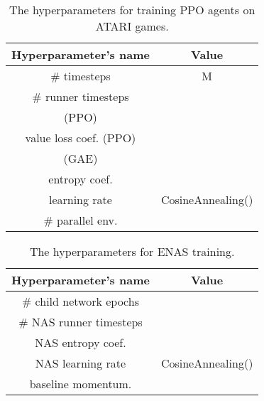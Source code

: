 \documentclass{svproc}
\begin{document}
\begin{appendix}
\begin{table}[!h]
\begin{center}
\begin{tabularx}{0.6\textwidth}{c|c}
    \hline
    \textbf{Hyperparameter's name} & \textbf{Value}\\
    \hline
        \# timesteps & M    \\
        \# runner timesteps &    \\  
         (PPO) &    \\
        value loss coef. (PPO) &  \\
         (GAE) &    \\
        entropy coef. &    \\
        learning rate & CosineAnnealing()   \\
        \# parallel env. &   \\
              
    \hline
\end{tabularx}
\caption{The hyperparameters for training PPO agents on ATARI games.}
\label{tab:params_scratch}
\end{center}
\end{table}

\begin{table}[!h]
\begin{center}
\begin{tabularx}{0.6\textwidth}{c|c}
    \hline
    \textbf{Hyperparameter's name} & \textbf{Value}\\
    \hline
        \# child network epochs &     \\
        \# NAS runner timesteps &    \\  
        NAS entropy coef. &    \\
        NAS learning rate & CosineAnnealing()   \\
        baseline momentum. &   \\
              
    \hline
\end{tabularx}
\caption{The hyperparameters for ENAS training.}
\label{tab:params_enas}
\end{center}
\end{table}



\end{appendix}
\end{document}

